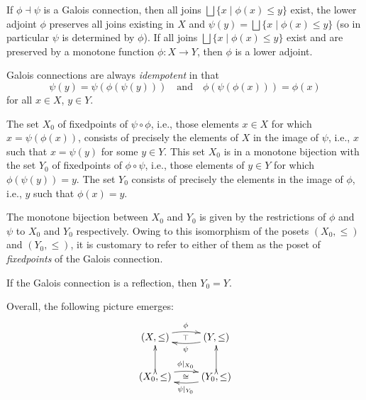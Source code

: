 \documentclass{llncs}
\newcommand{\bigjoin}{\bigsqcup}
\begin{document}
If $\phi \dashv \psi$ is a Galois connection, then all joins
$\bigjoin \{x \mid \phi(x) \leq y\}$ exist, the lower adjoint $\phi$
preserves all joins existing in $X$ and
$\psi(y) = \bigjoin \{x \mid \phi(x) \leq y\}$ (so in particular
$\psi$ is determined by $\phi$). If all joins
$\bigjoin \{x \mid \phi(x) \leq y\}$ exist and are preserved by a
monotone function $\phi : X \to Y$, then $\phi$ is a lower adjoint.


Galois connections are always \emph{idempotent} in that
\[
\psi(y) = \psi(\phi(\psi(y))) \quad \mathrm{and} \quad \phi(\psi(\phi(x))) = \phi(x)
\]  
for all $x \in X$, $y \in Y$.

The set $X_0$ of fixedpoints of $\psi \circ \phi$, i.e., those
elements $x \in X$ for which $x = \psi(\phi(x))$, consists of
precisely the elements of $X$ in the image of $\psi$, i.e., $x$ such
that $x = \psi(y)$ for some $y \in Y$. This set $X_0$ is in a monotone
bijection with the set $Y_0$ of fixedpoints of $\phi \circ \psi$,
i.e., those elements of $y \in Y$ for which $\phi(\psi(y)) = y$. The
set $Y_0$ consists of precisely the elements in the image of $\phi$,
i.e., $y$ such that $\phi(x) = y$.

The monotone bijection between $X_0$ and $Y_0$ is given by the
restrictions of $\phi$ and $\psi$ to $X_0$ and $Y_0$
respectively. Owing to this isomorphism of the posets $(X_0, \leq)$ and
$(Y_0, \leq)$, it is customary to refer to either of them as the poset
of \emph{fixedpoints} of the Galois connection.

If the Galois connection is a reflection, then $Y_0 = Y$. 

Overall, the following picture emerges:
\[
\xymatrix{
(X, \leq) \ar@/^0.5pc/[r]^{\phi} \ar@{}[r]|{\top}
& (Y, \leq) \ar@/^0.5pc/[l]^{\psi}\\   
(X_0, \leq) \ar@{>->}[u] \ar@/^0.5pc/[r]^{\phi|_{X_0}} \ar@{}[r]|{\cong}
& (Y_0, \leq) \ar@{>->}[u] \ar@/^0.5pc/[l]^{\psi|_{Y_0}}
}  
\]
\end{document}
